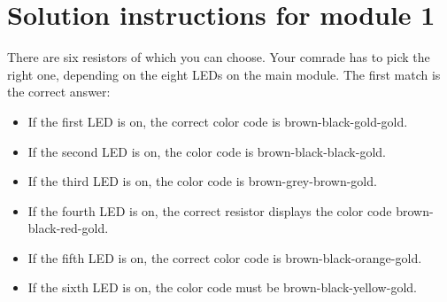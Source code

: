 \documentclass[a4paper, 12pt]{article}
\begin{document}
\section*{Solution instructions for module 1}

There are six resistors of which you can choose. Your comrade has to pick the right one, depending on the eight LEDs on the main module. The first match is the correct answer:
\begin{itemize}
\setlength{\itemsep}{0pt}
\item If the first LED is on, the correct color code is brown-black-gold-gold.
\item If the second LED is on, the color code is brown-black-black-gold.
\item If the third LED is on, the color code is brown-grey-brown-gold.
\item If the fourth LED is on, the correct resistor displays the color code brown-black-red-gold.
\item If the fifth LED is on, the correct color code is brown-black-orange-gold.
\item If the sixth LED is on, the color code must be brown-black-yellow-gold.
\end{itemize}
\end{document}
